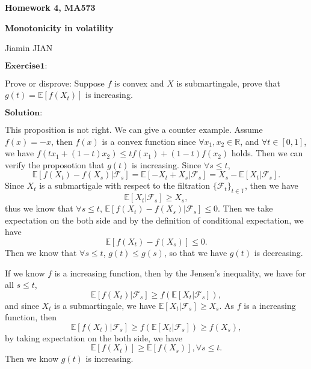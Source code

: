 \documentclass[12pt,a4paper]{ctexart}
\begin{document}
\begin{center}
\textbf{Homework 4, MA573}
\vspace{8pt}

\textbf{Monotonicity in volatility}

Jiamin JIAN
\end{center}

\vspace{12pt}

$\textbf{Exercise1:}$

Prove or disprove: Suppose $f$ is convex and $X$ is submartingale, prove that  $g(t) = \mathbb E[f(X_t)]$ is increasing.

\vspace{8pt}
$\textbf{Solution:}$

This proposition is not right. We can give a counter example. Assume $f(x) = -x$, then $f(x)$ is a convex function since $\forall x_{1}, x_{2} \in \mathbb{R}$, and $\forall t \in [0, 1]$, we have $f(t x_{1} + (1-t)x_{2}) \leq t f(x_{1}) + (1-t)f(x_{2})$ holds. Then we can verify the proposotion that $g(t)$ is increasing. Since $\forall s \leq t$,
\begin{equation*}
\mathbb{E} [f(X_{t}) - f(X_{s}) | \mathcal{F}_{s}] = \mathbb{E}[-X_{t} + X_{s} | \mathcal{F}_{s}] = X_{s} - \mathbb{E}[X_{t} | \mathcal{F}_{s}].
\end{equation*}
Since $X_{t}$ is a submartigale with respect to the filtration $\{\mathcal{F}_{t}\}_{t \in \mathbb{T}}$, then we have
\begin{equation*}
\mathbb{E}[X_{t} | \mathcal{F}_{s}] \geq X_{s},
\end{equation*}
thus we know that $\forall s \leq t$, $\mathbb{E} [f(X_{t}) - f(X_{s}) | \mathcal{F}_{s}] \leq 0$. Then we take expectation on the both side and by the definition of conditional expectation, we have
$$\mathbb{E} [f(X_{t}) - f(X_{s})] \leq 0.$$
Then we know that $\forall s \leq t$, $g(t) \leq g(s)$, so that we have $g(t)$ is decreasing.

If we know $f$ is a increasing function, then by the Jensen's inequality, we have for all $s \leq t$,
$$\mathbb{E} [f(X_{t}) | \mathcal{F}_{s}] \geq f(\mathbb{E} [X_{t} | \mathcal{F}_{s}]),$$
and since $X_{t}$ is a submartingale, we have $\mathbb{E} [X_{t} | \mathcal{F}_{s}] \geq X_{s}$. As $f$ is a increasing function, then
$$\mathbb{E} [f(X_{t}) | \mathcal{F}_{s}] \geq f(\mathbb{E} [X_{t} | \mathcal{F}_{s}]) \geq f(X_{s}),$$
by taking expectation on the both side, we have
$$\mathbb{E} [f(X_{t})] \geq \mathbb{E} [f(X_{s})], \forall s \leq t.$$
Then we know $g(t)$ is increasing.
\end{document}
